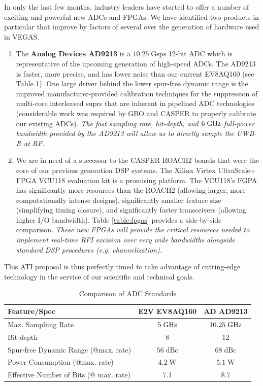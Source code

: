 \documentclass[10pt]{myNSF}
\begin{document}
 In only the last few months,
industry leaders have started to offer a number of exciting and
powerful new ADCs and FPGAs.  We have identified two products in
particular that improve by factors of several over the generation of
hardware used in VEGAS.
\begin{enumerate}
\item{The \textbf{Analog Devices AD9213} is a $10.25\; \mathrm{Gsps}$
    12-bit ADC which is representative of the upcoming generation of
    high-speed ADCs.  The AD9213 is faster, more precise, and has
    lower noise than our current EV8AQ160 (see Table
    \ref{table:adcs}).  One large driver behind the lower spur-free
    dynamic range is the improved manufacturer-provided calibration
    techniques for the suppression of multi-core interleaved suprs
    that are inherent in pipelined ADC technologies (considerable work
    was required by GBO and CASPER to properly calibrate our existing
    ADCs).  \emph{The fast sampling rate, bit-depth, and $6\; \textrm{GHz}$
      full-power bandwidth provided by the AD9213 will allow us to
      directly sample the UWB-R at RF.}}
\item{We are in need of a successor to the CASPER ROACH2 boards that
    were the core of our previous generation DSP systems.  The Xilinx
    Virtex UltraScale+ FPGA VCU118 evaluation kit is a promising
    platform.  The VCU118's FGPA has significantly more resources than
    the ROACH2 (allowing larger, more computationally intense
    designs), significantly smaller feature size (simplifying timing
    closure), and significantly faster transceivers (allowing higher
    I/O bandwidth).  Table \ref{table:fpgas} provides a side-by-side
    comparison.  \emph{These new FPGAs will provide the critical
      resources needed to implement real-time RFI excision over very
      wide bandwidths alongside standard DSP procedures
      (e.g. channelization).}}
\end{enumerate}
This ATI proposal is thus perfectly timed to take advantage of
cutting-edge technology in the service of our scientific and technical
goals.

\begin{table}[h]
  \centering
  \caption{Comparison of ADC Standards \label{table:adcs}}
  \begin{tabular}{|l|c|c|}
    \hline
    Feature/Spec & E2V EV8AQ160 & AD AD9213 \\
    \hline
    Max. Sampliing Rate & $5\; \textrm{GHz}$ & $10.25\; \textrm{GHz}$ \\
    Bit-depth & 8 & 12 \\
    Spur-free Dynamic Range (@max. rate) & $56\; \mathrm{dBc}$ & $68\; \mathrm{dBc}$ \\
    Power Consumption (@max. rate) & $4.2\; \mathrm{W}$ & $5.1\; \mathrm{W}$ \\
    Effective Number of Bits (@ max. rate) & 7.1 & 8.7 \\
    \hline
  \end{tabular}
\end{table}
\end{document}
